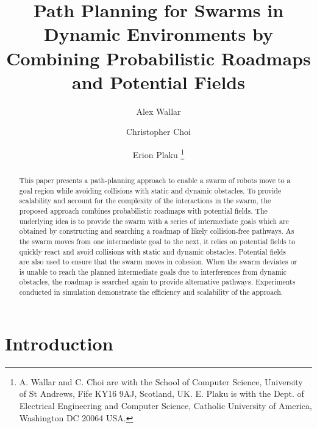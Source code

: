 \documentclass[letterpaper, 10pt, conference]{ieeeconf}
\begin{document}
\title{Path Planning for Swarms in Dynamic Environments by\\ Combining Probabilistic Roadmaps and
  Potential Fields}


\author{
Alex Wallar \and Christopher Choi \and Erion Plaku
\thanks{A. Wallar and C. Choi are with the School of Computer Science,
  University of St Andrews, Fife KY16 9AJ, Scotland, UK. E. Plaku is with the
  Dept. of Electrical Engineering and Computer Science, Catholic
  University of America, Washington DC 20064 USA.
}}

\maketitle
\begin{abstract}
This paper presents a path-planning approach to enable a swarm of
robots move to a goal region while avoiding collisions with static and
dynamic obstacles.  To provide scalability and account for the
complexity of the interactions in the swarm, the proposed approach
combines probabilistic roadmaps with potential fields.  The underlying
idea is to provide the swarm with a series of intermediate goals which
are obtained by constructing and searching a roadmap of likely
collision-free pathways. As the swarm moves from one intermediate goal
to the next, it relies on potential fields to quickly react and avoid
collisions with static and dynamic obstacles. Potential fields are
also used to ensure that the swarm moves in cohesion. When the swarm
deviates or is unable to reach the planned intermediate goals due to
interferences from dynamic obstacles, the roadmap is searched again to
provide alternative pathways. Experiments conducted in simulation
demonstrate the efficiency and scalability of the approach.
\end{abstract}


\section{Introduction}
\label{sec:Intro}
\end{document}
